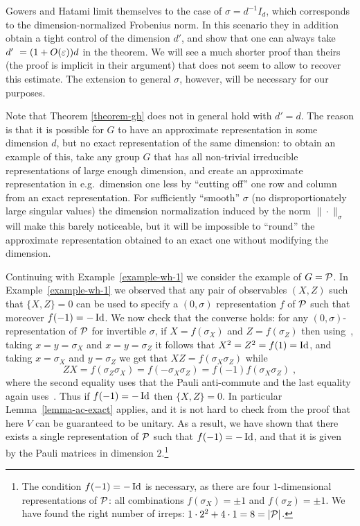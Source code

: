 Gowers and Hatami limit themselves to the case of $\sigma = d^{-1}I_d$, which corresponds to the dimension-normalized Frobenius norm. In this scenario they in addition obtain a tight control of the dimension $d'$, and show that one can always take $d'\ = (1+O(\varepsilon))d$ in the theorem. We will see a much shorter proof than theirs (the proof is implicit in their argument) that does not seem to allow to recover this estimate. The extension to general $\sigma$, however, will be necessary for our purposes.

Note that  Theorem \ref{theorem-gh} does not in general hold  with $d'=d$. The reason is that it is possible for $G$ to have an approximate representation in some dimension $d$, but no exact representation of the same dimension: to obtain an example of this, take any group $G$ that has all non-trivial irreducible representations of large enough dimension, and create an approximate representation in e.g.\ dimension one less by ``cutting off'' one row and column from an exact representation. For sufficiently ``smooth'' $\sigma$ (no disproportionately large singular values) the dimension normalization induced by the norm $\|\cdot\|_\sigma$ will make this barely  noticeable, but it will be impossible to ``round'' the approximate representation obtained to an exact one without modifying the dimension. 

\begin{example}
\label{example-wh-3}
Continuing with Example~\ref{example-wh-1} we consider the example of $G= \mathcal{P}$. In Example~\ref{example-wh-1} we observed that any pair of observables $(X,Z)$ such that $\{X,Z\}=0$ can be used to specify a $(0,\sigma)$ representation $f$ of $\mathcal{P}$ such that moreover $f(-1)=-\mathop{\rm Id}\nolimits$. We now check that the converse holds: for any $(0,\sigma)$-representation of $\mathcal{P}$ for invertible $\sigma$, if $X=f(\sigma_X)$ and $Z=f(\sigma_Z)$ then using~, taking $x=y=\sigma_X$ and $x=y=\sigma_Z$ it follows that $X^2 = Z^2=f(1)=\mathop{\rm Id}\nolimits$, and taking $x=\sigma_X$ and $y=\sigma_Z$ we get that $XZ=f(\sigma_X \sigma_Z)$ while 
\[ZX=f(\sigma_Z\sigma_X)=f(-\sigma_X\sigma_Z)=f(-1)f(\sigma_X\sigma_Z)\;,\]
where the second equality uses that the Pauli anti-commute and the last equality again uses~. Thus if $f(-1)=-\mathop{\rm Id}\nolimits$ then 
 $\{X,Z\}=0$. In particular Lemma~\ref{lemma-ac-exact} applies, and it is not hard to check from the proof that here $V$ can be guaranteed to be unitary. As a result, we have shown that there exists a single  representation of $\mathcal{P}$ such that $f(-1)=-\mathop{\rm Id}\nolimits$, and that it is given by the Pauli matrices in dimension $2$.\footnote{The condition $f(-1)=-\mathop{\rm Id}\nolimits$ is necessary, as there are four $1$-dimensional representations of $\mathcal{P}$: all combinations $f(\sigma_X)=\pm 1$ and $f(\sigma_Z)=\pm 1$. We have found the right number of irreps: $1\cdot 2^2 + 4\cdot 1 = 8 = |\mathcal{P}|$.}
\end{example}

